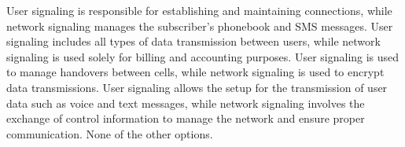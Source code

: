 \begin{checkboxes}
    \choice User signaling is responsible for establishing and maintaining connections, while network signaling manages the subscriber's phonebook and SMS messages.
    \choice User signaling includes all types of data transmission between users, while network signaling is used solely for billing and accounting purposes.
    \choice User signaling is used to manage handovers between cells, while network signaling is used to encrypt data transmissions.
    \CorrectChoice User signaling allows the setup for the transmission of user data such as voice and text messages, while network signaling involves the exchange of control information to manage the network and ensure proper communication.
    \choice None of the other options.
\end{checkboxes}